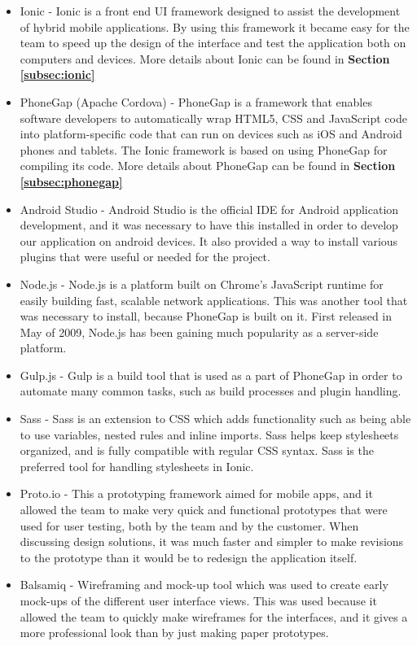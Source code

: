 \begin{itemize}
	\item Ionic \cite{es1} - Ionic is a front end UI framework designed to assist the development of hybrid mobile applications. By using this framework it became easy for the team to speed up the design of the interface and test the application both on computers and devices. More details about Ionic can be found in \textbf{Section \ref{subsec:ionic}}
	\item PhoneGap (Apache Cordova) \cite{RA2} - PhoneGap is a framework that enables software developers to automatically wrap HTML5, CSS and JavaScript code into platform-specific code that can run on devices such as iOS and Android phones and tablets. The Ionic framework is based on using PhoneGap for compiling its code. More details about PhoneGap can be found in \textbf{Section \ref{subsec:phonegap}}
	\item Android Studio \cite{es22} - Android Studio is the official IDE for Android application development, and it was necessary to have this installed in order to develop our application on android devices. It also provided a way to install various plugins that were useful or needed for the project.
	\item Node.js \cite{es23} - Node.js is a platform built on Chrome’s JavaScript runtime for easily building fast, scalable network applications. This was another tool that was necessary to install, because PhoneGap is built on it. First released in May of 2009, Node.js has been gaining much popularity as a server-side platform. 
	\item Gulp.js \cite{es24} - Gulp is a build tool that is used as a part of PhoneGap in order to automate many common tasks, such as build processes and plugin handling.
	\item Sass \cite{es25} - Sass is an extension to CSS which adds functionality such as being able to use variables, nested rules and inline imports. Sass helps keep stylesheets organized, and is fully compatible with regular CSS syntax. Sass is the preferred tool for handling stylesheets in Ionic.
	\item Proto.io \cite{protoIO} - This a prototyping framework aimed for mobile apps, and it allowed the team to make very quick and functional prototypes that were used for user testing, both by the team and by the customer. When discussing design solutions, it was much faster and simpler to make revisions to the prototype than it would be to redesign the application itself. 
	\item Balsamiq \cite{es3} - Wireframing and mock-up tool which was used to create early mock-ups of the different user interface views. This was used because it allowed the team to quickly make wireframes for the interfaces, and it gives a more professional look than by  just making paper prototypes.

\end{itemize}
